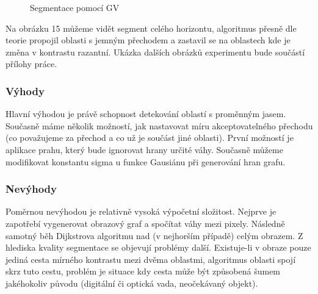 \documentclass[czech, master, public, dept460, male, cpdeclaration, oneside]{diploma}
\begin{document}
\begin{figure}[H]
	\centering	
	\caption{Segmentace pomocí GV}
\end{figure}
\noindent
Na obrázku 15 můžeme vidět segment celého horizontu, algoritmus přesně dle teorie propojil oblasti s jemným přechodem a zastavil se na oblastech kde je změna v kontrastu razantní. Ukázka dalších obrázků experimentu bude součástí přílohy práce.\par

\subsubsection{Výhody}
Hlavní výhodou je právě schopnost detekování oblastí s proměnným jasem. Současně máme několik možností, jak nastavovat míru akceptovatelného přechodu (co považujeme za přechod a co už je součást jiné oblasti). První možností je aplikace prahu, který bude ignorovat hrany určité váhy. Současně můžeme modifikovat konstantu sigma u funkce Gausiánu při generování hran grafu.

\subsubsection{Nevýhody}
Poměrnou nevýhodou je relativně vysoká výpočetní složitost. Nejprve je zapotřebí vygenerovat obrazový graf a spočítat váhy mezi pixely. Následně samotný běh Dijkstrova algoritmu nad (v nejhorším případě) celým obrazem. Z hlediska kvality segmentace se objevují problémy další. Existuje-li v obraze pouze jediná cesta mírného kontrastu mezi dvěma oblastmi, algoritmus oblasti spojí skrz tuto cestu, problém je situace kdy cesta může být způsobená šumem jakéhokoliv původu (digitální či optická vada, neočekávaný objekt).
\end{document}
